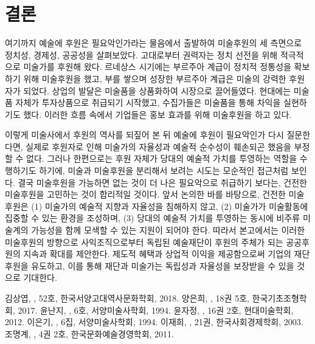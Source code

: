 \section{결론}

여기까지 예술에 후원은 필요악인가라는 물음에서 출발하여 미술후원의 세 측면으로 정치성, 경제성, 공공성을 살펴보았다. 고대로부터 권력자는 정치 선전을 위해 적극적으로 미술가를 후원해 왔다. 르네상스 시기에는 부르주아 계급이 정치적 정통성을 확보하기 위해 미술후원을 했고, 부를 쌓으며 성장한 부르주아 계급은 미술의 강력한 후원자가 되었다. 상업의 발달은 미술품을 상품화하여 시장으로 끌어들였다. 현대에는 미술품 자체가 투자상품으로 취급되기 시작했고, 수집가들은 미술품을 통해 차익을 실현하기도 했다. 이러한 흐름 속에서 기업들은 홍보 효과를 위해 미술후원을 하고 있다.

이렇게 미술사에서 후원의 역사를 되짚어 본 뒤 예술에 후원이 필요악인가 다시 질문한다면, 실제로 후원자로 인해 미술가의 자율성과 예술적 순수성이 훼손되곤 했음을 부정할 수 없다. 그러나 한편으로는 후원 자체가 당대의 예술적 가치를 투영하는 역할을 수행하기도 하기에, 미술과 미술후원을 분리해서 보려는 시도는 모순적인 접근처럼 보인다. 결국 미술후원을 가능하면 없는 것이 더 나은 필요악으로 취급하기 보다는, 건전한 미술후원을 고민하는 것이 합리적일 것이다. 앞서 논의한 바를 바탕으로, 건전한 미술후원은 (1) 미술가의 예술적 지향과 자율성을 침해하지 않고, (2) 미술가가 미술활동에 집중할 수 있는 환경을 조성하며, (3) 당대의 예술적 가치를 투영하는 동시에 비주류 미술계의 가능성을 함께 모색할 수 있는 지원이 되어야 한다. 따라서 본고에서는 이러한 미술후원의 방향으로 사익조직으로부터 독립된 예술재단이 후원의 주체가 되는 공공후원의 지속과 확대를 제안한다. 제도적 혜택과 상업적 이익을 제공함으로써 기업의 재단 후원을 유도하고, 이를 통해 재단과 미술가는 독립성과 자율성을 보장받을 수 있을 것으로 기대한다.

\begin{thebibliography}{9}
   김상엽, ,  52호, 한국서양고대역사문화학회, 2018.
   양은희, ,  18권 5호, 한국기초조형학회, 2017.
   윤난지, ,  6호, 서양미술사학회, 1994.
   윤자정, ,  16권 2호, 현대미술학회, 2012.
   이은기, ,  6집, 서양미술사학회, 1994.
   이재희, ,  21권, 한국사회경제학회, 2003.
   조명계, ,  4권 2호, 한국문화예술경영학회, 2011.
\end{thebibliography}
